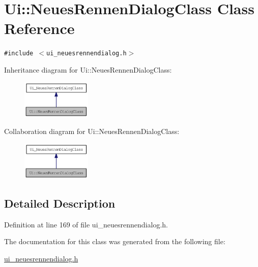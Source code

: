 \hypertarget{class_ui_1_1_neues_rennen_dialog_class}{
\section{Ui::NeuesRennenDialogClass Class Reference}
\label{class_ui_1_1_neues_rennen_dialog_class}
}
{\tt \#include $<$ui\_\-neuesrennendialog.h$>$}

Inheritance diagram for Ui::NeuesRennenDialogClass:\nopagebreak
\begin{figure}[H]
\begin{center}
\leavevmode
\includegraphics[width=94pt]{class_ui_1_1_neues_rennen_dialog_class__inherit__graph}
\end{center}
\end{figure}
Collaboration diagram for Ui::NeuesRennenDialogClass:\nopagebreak
\begin{figure}[H]
\begin{center}
\leavevmode
\includegraphics[width=94pt]{class_ui_1_1_neues_rennen_dialog_class__coll__graph}
\end{center}
\end{figure}


\subsection{Detailed Description}


Definition at line 169 of file ui\_\-neuesrennendialog.h.

The documentation for this class was generated from the following file:\begin{CompactItemize}
\item 
\hyperlink{ui__neuesrennendialog_8h}{ui\_\-neuesrennendialog.h}\end{CompactItemize}
